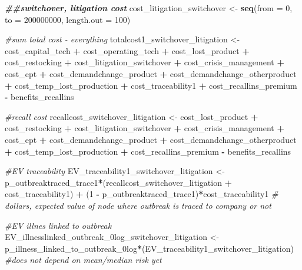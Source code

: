 \documentclass[
]{article}
\newenvironment{Shaded}{\begin{snugshade}}{\end{snugshade}}
\newcommand{\AttributeTok}[1]{\textcolor[rgb]{0.13,0.29,0.53}{#1}}
\newcommand{\CommentTok}[1]{\textcolor[rgb]{0.56,0.35,0.01}{\textit{#1}}}
\newcommand{\DecValTok}[1]{\textcolor[rgb]{0.00,0.00,0.81}{#1}}
\newcommand{\DocumentationTok}[1]{\textcolor[rgb]{0.56,0.35,0.01}{\textbf{\textit{#1}}}}
\newcommand{\FunctionTok}[1]{\textcolor[rgb]{0.13,0.29,0.53}{\textbf{#1}}}
\newcommand{\NormalTok}[1]{#1}
\newcommand{\OtherTok}[1]{\textcolor[rgb]{0.56,0.35,0.01}{#1}}
\newcommand{\SpecialCharTok}[1]{\textcolor[rgb]{0.81,0.36,0.00}{\textbf{#1}}}
\begin{document}
\begin{Shaded}
\begin{Highlighting}[]
\DocumentationTok{\#\#switchover, litigation cost}
\NormalTok{cost\_litigation\_switchover }\OtherTok{\textless{}{-}} \FunctionTok{seq}\NormalTok{(}\AttributeTok{from =} \DecValTok{0}\NormalTok{, }\AttributeTok{to =} \DecValTok{200000000}\NormalTok{, }\AttributeTok{length.out =} \DecValTok{100}\NormalTok{)}

\CommentTok{\#sum total cost {-} everything}
\NormalTok{totalcost1\_switchover\_litigation }\OtherTok{\textless{}{-}}\NormalTok{ cost\_capital\_tech }\SpecialCharTok{+}\NormalTok{ cost\_operating\_tech }\SpecialCharTok{+}\NormalTok{ cost\_lost\_product }\SpecialCharTok{+}\NormalTok{ cost\_restocking }\SpecialCharTok{+}\NormalTok{ cost\_litigation\_switchover }\SpecialCharTok{+}\NormalTok{ cost\_crisis\_management }\SpecialCharTok{+}\NormalTok{ cost\_ept }\SpecialCharTok{+}\NormalTok{ cost\_demandchange\_product }\SpecialCharTok{+}\NormalTok{ cost\_demandchange\_otherproduct }\SpecialCharTok{+}\NormalTok{ cost\_temp\_lost\_production }\SpecialCharTok{+}\NormalTok{ cost\_traceability1 }\SpecialCharTok{+}\NormalTok{ cost\_recallins\_premium }\SpecialCharTok{{-}}\NormalTok{ benefits\_recallins}

\CommentTok{\#recall cost}
\NormalTok{recallcost\_switchover\_litigation }\OtherTok{\textless{}{-}}\NormalTok{ cost\_lost\_product }\SpecialCharTok{+}\NormalTok{ cost\_restocking }\SpecialCharTok{+}\NormalTok{ cost\_litigation\_switchover }\SpecialCharTok{+}\NormalTok{ cost\_crisis\_management }\SpecialCharTok{+}\NormalTok{ cost\_ept }\SpecialCharTok{+}\NormalTok{ cost\_demandchange\_product }\SpecialCharTok{+}\NormalTok{ cost\_demandchange\_otherproduct }\SpecialCharTok{+}\NormalTok{ cost\_temp\_lost\_production }\SpecialCharTok{+}\NormalTok{ cost\_recallins\_premium  }\SpecialCharTok{{-}}\NormalTok{ benefits\_recallins }

\CommentTok{\#EV traceability}
\NormalTok{EV\_traceability1\_switchover\_litigation }\OtherTok{\textless{}{-}}\NormalTok{ p\_outbreaktraced\_trace1}\SpecialCharTok{*}\NormalTok{(recallcost\_switchover\_litigation }\SpecialCharTok{+}\NormalTok{ cost\_traceability1) }\SpecialCharTok{+}\NormalTok{ (}\DecValTok{1} \SpecialCharTok{{-}}\NormalTok{ p\_outbreaktraced\_trace1)}\SpecialCharTok{*}\NormalTok{cost\_traceability1 }\CommentTok{\# dollars, expected value of node where outbreak is traced to company or not}


\CommentTok{\#EV illnes linked to outbreak}
\NormalTok{EV\_illnesslinked\_outbreak\_0log\_switchover\_litigation }\OtherTok{\textless{}{-}}\NormalTok{ p\_illness\_linked\_to\_outbreak\_0log}\SpecialCharTok{*}\NormalTok{(EV\_traceability1\_switchover\_litigation) }\CommentTok{\#does not depend on mean/median risk yet}


\end{Highlighting}
\end{Shaded}
\end{document}
